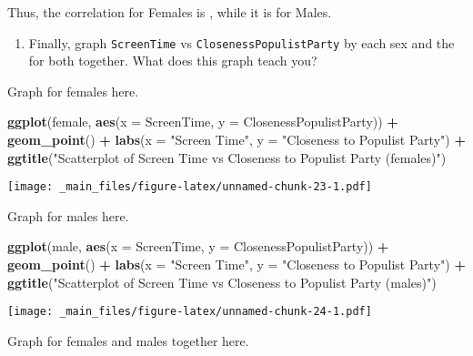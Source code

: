 \documentclass[
]{book}
\newenvironment{Shaded}{\begin{snugshade}}{\end{snugshade}}
\newcommand{\AttributeTok}[1]{\textcolor[rgb]{0.13,0.29,0.53}{#1}}
\newcommand{\FunctionTok}[1]{\textcolor[rgb]{0.13,0.29,0.53}{\textbf{#1}}}
\newcommand{\NormalTok}[1]{#1}
\newcommand{\SpecialCharTok}[1]{\textcolor[rgb]{0.81,0.36,0.00}{\textbf{#1}}}
\newcommand{\StringTok}[1]{\textcolor[rgb]{0.31,0.60,0.02}{#1}}
\providecommand{\tightlist}{%
  \setlength{\itemsep}{0pt}\setlength{\parskip}{0pt}}
\begin{document}
Thus, the correlation for Females is , while it is for Males.

\begin{enumerate}
\def\labelenumi{\arabic{enumi}.}
\setcounter{enumi}{3}
\tightlist
\item
  Finally, graph \texttt{ScreenTime} vs \texttt{ClosenessPopulistParty} by each sex and the for both together. What does this graph teach you?
\end{enumerate}

Graph for females here.

\begin{Shaded}
\begin{Highlighting}[]
\FunctionTok{ggplot}\NormalTok{(female, }\FunctionTok{aes}\NormalTok{(}\AttributeTok{x =}\NormalTok{ ScreenTime, }\AttributeTok{y =}\NormalTok{ ClosenessPopulistParty)) }\SpecialCharTok{+}
  \FunctionTok{geom\_point}\NormalTok{() }\SpecialCharTok{+}
  \FunctionTok{labs}\NormalTok{(}\AttributeTok{x =} \StringTok{"Screen Time"}\NormalTok{, }\AttributeTok{y =} \StringTok{"Closeness to Populist Party"}\NormalTok{) }\SpecialCharTok{+}
  \FunctionTok{ggtitle}\NormalTok{(}\StringTok{"Scatterplot of Screen Time vs Closeness to Populist Party (females)"}\NormalTok{)}
\end{Highlighting}
\end{Shaded}

\texttt{[image: \_main\_files/figure-latex/unnamed-chunk-23-1.pdf]}

Graph for males here.

\begin{Shaded}
\begin{Highlighting}[]
\FunctionTok{ggplot}\NormalTok{(male, }\FunctionTok{aes}\NormalTok{(}\AttributeTok{x =}\NormalTok{ ScreenTime, }\AttributeTok{y =}\NormalTok{ ClosenessPopulistParty)) }\SpecialCharTok{+}
  \FunctionTok{geom\_point}\NormalTok{() }\SpecialCharTok{+}
  \FunctionTok{labs}\NormalTok{(}\AttributeTok{x =} \StringTok{"Screen Time"}\NormalTok{, }\AttributeTok{y =} \StringTok{"Closeness to Populist Party"}\NormalTok{) }\SpecialCharTok{+}
  \FunctionTok{ggtitle}\NormalTok{(}\StringTok{"Scatterplot of Screen Time vs Closeness to Populist Party (males)"}\NormalTok{)}
\end{Highlighting}
\end{Shaded}

\texttt{[image: \_main\_files/figure-latex/unnamed-chunk-24-1.pdf]}

Graph for females and males together here.
\end{document}
